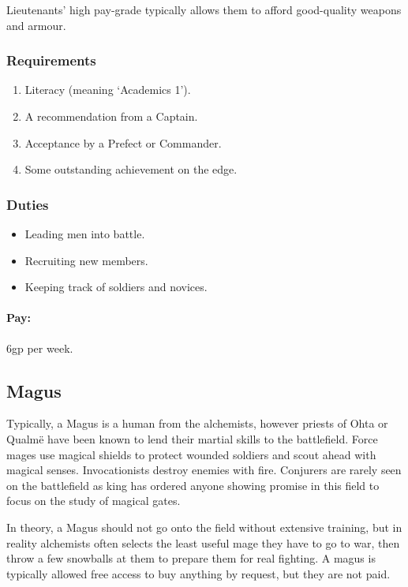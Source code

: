 \begin{multicols}{2}
Lieutenants' high pay-grade typically allows them to afford good-quality weapons and armour.

\subsubsection{Requirements}

\begin{enumerate}
  \item
  Literacy (meaning `Academics 1').
  \item
  A recommendation from a Captain.
  \item
  Acceptance by a Prefect or Commander.
  \item
  Some outstanding achievement on the \gls{edge}.
\end{enumerate}

\subsubsection{Duties}

\begin{itemize}
  \item
  Leading men into battle.
  \item
  Recruiting new members.
  \item
  Keeping track of soldiers and novices.
\end{itemize}

\paragraph{Pay:} 6gp per week.

\subsection{Magus}

Typically, a Magus is a human from the \gls{alchemists}, however priests of Ohta or Qualm\"e have been known to lend their martial skills to the battlefield.
Force mages use magical shields to protect wounded soldiers and scout ahead with magical senses.
Invocationists destroy enemies with fire.
Conjurers are rarely seen on the battlefield as \gls{king} has ordered anyone showing promise in this field to focus on the study of magical gates.

In theory, a Magus should not go onto the field without extensive training, but in reality \gls{alchemists} often selects the least useful mage they have to go to war, then throw a few snowballs at them to prepare them for real fighting.
A magus is typically allowed free access to buy anything by request, but they are not paid.


\end{multicols}
